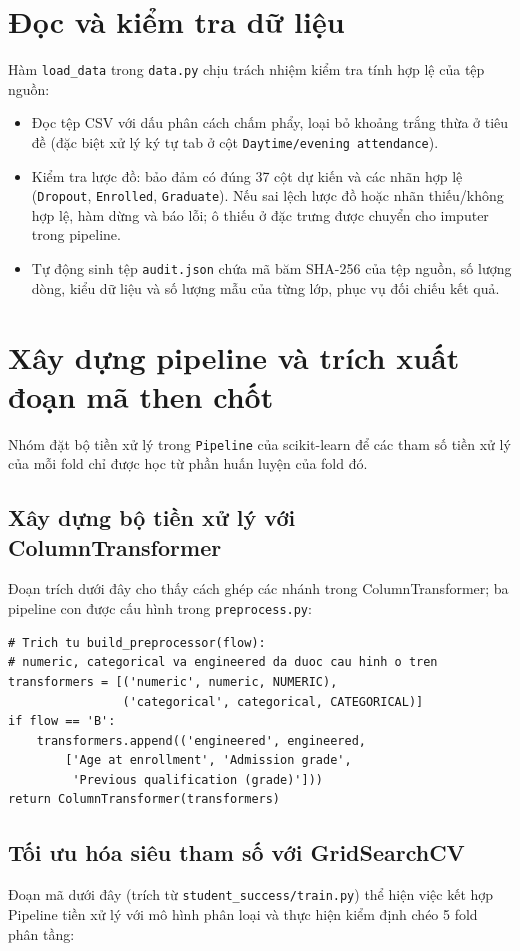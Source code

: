 \section{Đọc và kiểm tra dữ liệu}
Hàm \texttt{load\_data} trong \texttt{data.py} chịu trách nhiệm kiểm tra tính hợp lệ của tệp nguồn:
\begin{itemize}
    \item Đọc tệp CSV với dấu phân cách chấm phẩy, loại bỏ khoảng trắng thừa ở tiêu đề (đặc biệt xử lý ký tự tab ở cột \texttt{Daytime/evening attendance}).
    \item Kiểm tra lược đồ: bảo đảm có đúng 37 cột dự kiến và các nhãn hợp lệ (\texttt{Dropout}, \texttt{Enrolled}, \texttt{Graduate}). Nếu sai lệch lược đồ hoặc nhãn thiếu/không hợp lệ, hàm dừng và báo lỗi; ô thiếu ở đặc trưng được chuyển cho imputer trong pipeline.
    \item Tự động sinh tệp \texttt{audit.json} chứa mã băm SHA-256 của tệp nguồn, số lượng dòng, kiểu dữ liệu và số lượng mẫu của từng lớp, phục vụ đối chiếu kết quả.
\end{itemize}

\section{Xây dựng pipeline và trích xuất đoạn mã then chốt}
Nhóm đặt bộ tiền xử lý trong \texttt{Pipeline} của scikit-learn để các tham số tiền xử lý của mỗi fold chỉ được học từ phần huấn luyện của fold đó.

\subsection{Xây dựng bộ tiền xử lý với ColumnTransformer}
Đoạn trích dưới đây cho thấy cách ghép các nhánh trong ColumnTransformer; ba pipeline con được cấu hình trong \texttt{preprocess.py}:

{\footnotesize\begin{verbatim}
# Trich tu build_preprocessor(flow):
# numeric, categorical va engineered da duoc cau hinh o tren
transformers = [('numeric', numeric, NUMERIC),
                ('categorical', categorical, CATEGORICAL)]
if flow == 'B':
    transformers.append(('engineered', engineered,
        ['Age at enrollment', 'Admission grade',
         'Previous qualification (grade)']))
return ColumnTransformer(transformers)
\end{verbatim}
}

\subsection{Tối ưu hóa siêu tham số với GridSearchCV}
Đoạn mã dưới đây (trích từ \texttt{student\_success/train.py}) thể hiện việc kết hợp Pipeline tiền xử lý với mô hình phân loại và thực hiện kiểm định chéo 5 fold phân tầng:

